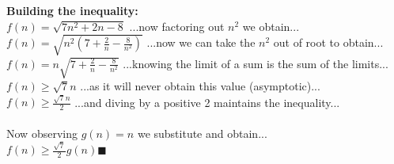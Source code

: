 \documentclass[OPONE]{example}
\begin{document}
\begin{list}{}{}
\\
\\
\textbf{Building the inequality:} \\
$f(n) = \sqrt{7n^{2} + 2n - 8} $ \hspace{1.0 in} ...now factoring out $n^{2} $ we obtain...\\
$f(n) = \sqrt{n^{2}(7 + \frac{2}{n} - \frac{8}{n^{2}})} $ \hspace{.85 in} ...now we can take the $n^{2}$ out of root to obtain...\\
$f(n) = n\sqrt{7 + \frac{2}{n} - \frac{8}{n^{2}}} $ \hspace{1.05 in} ...knowing the limit of a sum is the sum of the limits...\\
$f(n) \geq \sqrt{7}n $ \hspace{1.65 in} ...as it will never obtain this value (asymptotic)...\\
$f(n) \geq \frac{\sqrt{7}n}{2} $ \hspace{1.65 in} ...and diving by a positive 2 maintains the inequality...\\
\\
Now observing $g(n) = n$  we substitute and obtain... \\
$f(n) \geq \frac{\sqrt{7}}{2}g(n)  \blacksquare$ \\
\\

\end{list}


\end{document}
